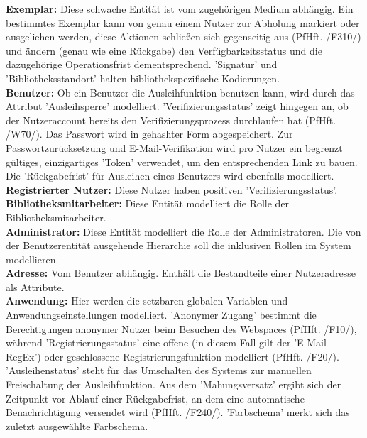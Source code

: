 \documentclass{article}
\begin{document}
\textbf{Exemplar:} Diese schwache Entität ist vom zugehörigen Medium abhängig. Ein bestimmtes Exemplar kann von genau einem Nutzer zur Abholung markiert oder ausgeliehen werden, diese Aktionen schließen sich gegenseitig aus (PfHft. /F310/) und ändern (genau wie eine Rückgabe) den Verfügbarkeitsstatus und die dazugehörige Operationsfrist dementsprechend. 'Signatur' und 'Bibliotheksstandort' halten bibliothekspezifische Kodierungen. \\
\textbf{Benutzer:} Ob ein Benutzer die Ausleihfunktion benutzen kann, wird durch das Attribut 'Ausleihsperre' modelliert. 'Verifizierungsstatus' zeigt hingegen an, ob der Nutzeraccount bereits den Verifizierungsprozess durchlaufen hat (PfHft. /W70/). Das Passwort wird in gehashter Form abgespeichert. Zur Passwortzurücksetzung und E-Mail-Verifikation wird pro Nutzer ein begrenzt gültiges, einzigartiges 'Token' verwendet, um den entsprechenden Link zu bauen. Die 'Rückgabefrist' für Ausleihen eines Benutzers wird ebenfalls modelliert.\\
\textbf{Registrierter Nutzer:} Diese Nutzer haben positiven 'Verifizierungsstatus'.\\
\textbf{Bibliotheksmitarbeiter:} Diese Entität modelliert die Rolle der Bibliotheksmitarbeiter.\\
\textbf{Administrator:} Diese Entität modelliert die Rolle der Administratoren. Die von der Benutzerentität ausgehende Hierarchie soll die inklusiven Rollen im System modellieren.  \\
\textbf{Adresse:} Vom Benutzer abhängig. Enthält die Bestandteile einer Nutzeradresse als Attribute. \\
\textbf{Anwendung:} Hier werden die setzbaren globalen Variablen und Anwendungseinstellungen modelliert. 'Anonymer Zugang' bestimmt die Berechtigungen anonymer Nutzer beim Besuchen des Webspaces (PfHft. /F10/), während 'Registrierungsstatus' eine offene (in diesem Fall gilt der 'E-Mail RegEx') oder geschlossene Registrierungsfunktion modelliert (PfHft. /F20/). 'Ausleihenstatus' steht für das Umschalten des Systems zur manuellen Freischaltung der Ausleihfunktion. Aus dem 'Mahungsversatz' ergibt sich der Zeitpunkt vor Ablauf einer Rückgabefrist, an dem eine automatische Benachrichtigung versendet wird (PfHft. /F240/). \hypertarget{Farbschemaattribut}{'Farbschema'} merkt sich das zuletzt ausgewählte Farbschema. \\
\end{document}
